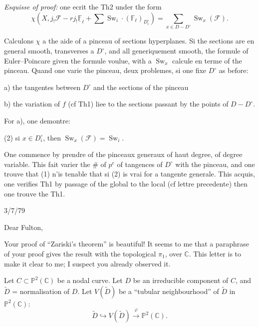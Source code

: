 \documentclass[11pt,a4paper]{article}
\theoremstyle{plain}
\theoremstyle{definition}
\DeclareMathOperator{\Sw}{Sw}
\begin{document}
\medskip

\noindent \textit{Esquisse of proof:} one ecrit the Th2 under the form
\[
\chi(X, j_! \mathcal{F} - r j_! \underline{\mathbb{F}}_\ell + \sum \Sw_i \cdot (\mathbb{F}_\ell)_{D_i^\circ}) = \sum_{x \in D - D^\circ} \Sw_x(\mathcal{F}).
\]

Calculons $\chi$ a the aide of a pinceau of sections hyperplanes. Si the sections are en general smooth, transverses a $D^\circ$, and all generiquement smooth, the formule of Euler--Poincare given the formule voulue, with a $\Sw_x$ calcule en terme of the pinceau. Quand one varie the pinceau, deux problemes, si one fixe $D^\circ$ as before:

a) the tangentes between $D^\circ$ and the sections of the pinceau

b) the variation of $f$ (cf Th1) liee to the sections passant by the points of $D - D^\circ$.

\medskip

For a), one demontre:

(2) si $x \in D_i^\circ$, then $\Sw_x(\mathcal{F}) = \Sw_i$.

\medskip

One commence by prendre of the pinceaux generaux of haut degree, of degree variable. This fait varier the $\#$ of $p^e$ of tangences of $D^\circ$ with the pinceau, and one trouve that (1) n'is tenable that si (2) is vrai for a tangente generale. This acquis, one verifies Th1 by passage of the global to the local (cf lettre precedente) then one trouve the Th1.

\newpage

\begin{flushright}
3/7/79
\end{flushright}

\noindent Dear Fulton,

\medskip

Your proof of ``Zariski's theorem'' is beautiful! It seems to me that a paraphrase of your proof gives the result with the topological $\pi_1$, over $\mathbb{C}$. This letter is to make it clear to me; I suspect you already observed it.

Let $C \subset \mathbb{P}^2(\mathbb{C})$ be a nodal curve. Let $D$ be an irreducible component of $C$, and $\widetilde{D}$ = normalisation of $D$. Let $V(\widetilde{D})$ be a ``tubular neighbourhood'' of $\widetilde{D}$ in $\mathbb{P}^2(\mathbb{C})$:
\[
\widetilde{D} \hookrightarrow V(\widetilde{D}) \xrightarrow{\varphi} \mathbb{P}^2(\mathbb{C}).
\]
\end{document}
